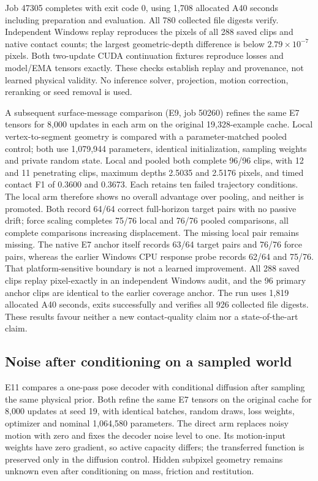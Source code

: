 \documentclass[11pt,a4paper]{article}
\begin{document}
Job 47305 completes with exit code 0, using 1,708 allocated A40 seconds including preparation and evaluation. All 780 collected file digests verify. Independent Windows replay reproduces the pixels of all 288 saved clips and native contact counts; the largest geometric-depth difference is below $2.79\times10^{-7}$ pixels. Both two-update CUDA continuation fixtures reproduce losses and model/EMA tensors exactly. These checks establish replay and provenance, not learned physical validity. No inference solver, projection, motion correction, reranking or seed removal is used.

A subsequent surface-message comparison (E9, job 50260) refines the same E7
tensors for 8,000 updates in each arm on the original 19,328-example cache.
Local vertex-to-segment geometry is compared with a parameter-matched pooled
control; both use 1,079,944 parameters, identical initialization, sampling weights
and private random state. Local and pooled both complete 96/96 clips, with
12 and 11 penetrating clips, maximum depths 2.5035 and 2.5176 pixels, and timed
contact F1 of 0.3600 and 0.3673. Each retains ten failed trajectory conditions.
The local arm therefore shows no overall advantage over pooling, and neither
is promoted. Both record 64/64 correct full-horizon target pairs with no passive
drift; force scaling completes 75/76 local and 76/76 pooled comparisons, all
complete comparisons increasing displacement. The missing local pair remains
missing. The native E7 anchor itself records 63/64 target pairs and 76/76 force
pairs, whereas the earlier Windows CPU response probe records 62/64 and 75/76.
That platform-sensitive boundary is not a learned improvement. All 288 saved
clips replay pixel-exactly in an independent Windows audit, and the
96 primary anchor clips are identical to the earlier coverage anchor. The run
uses 1,819 allocated A40 seconds, exits successfully and verifies all 926 collected
file digests. These results favour neither a new contact-quality claim nor a
state-of-the-art claim.

\subsection{Noise after conditioning on a sampled world}
E11 compares a one-pass pose decoder with conditional diffusion after sampling
the same physical prior. Both refine the same E7 tensors on the original cache
for 8,000 updates at seed 19, with identical batches, random draws, loss weights,
optimizer and nominal 1,064,580 parameters. The direct arm replaces noisy motion
with zero and fixes the decoder noise level to one. Its motion-input weights
have zero gradient, so active capacity differs; the transferred function is
preserved only in the diffusion control. Hidden subpixel geometry remains
unknown even after conditioning on mass, friction and restitution.
\end{document}
